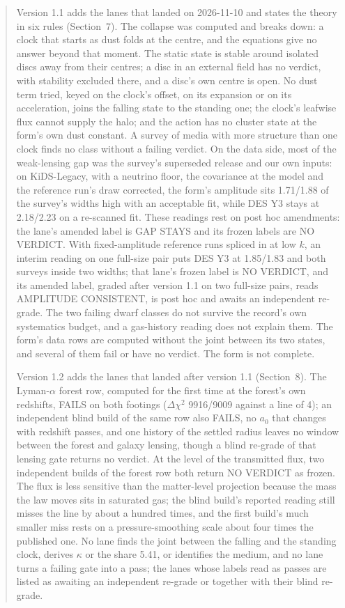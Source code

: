 \documentclass[10pt]{article}
\begin{document}
\begin{abstract}
Version 1.1 adds the lanes that landed on 2026-11-10 and states the theory in six rules (Section~7).
The collapse was computed and breaks down: a clock that starts as dust folds at the centre, and the equations give no answer beyond that moment.
The static state is stable around isolated discs away from their centres; a disc in an external field has no verdict, with stability excluded there, and a disc's own centre is open.
No dust term tried, keyed on the clock's offset, on its expansion or on its acceleration, joins the falling state to the standing one; the clock's leafwise flux cannot supply the halo; and the action has no cluster state at the form's own dust constant.
A survey of media with more structure than one clock finds no class without a failing verdict.
On the data side, most of the weak-lensing gap was the survey's superseded release and our own inputs: on KiDS-Legacy, with a neutrino floor, the covariance at the model and the reference run's draw corrected, the form's amplitude sits 1.71/1.88 of the survey's widths high with an acceptable fit, while DES Y3 stays at 2.18/2.23 on a re-scanned fit. These readings rest on post hoc amendments: the lane's amended label is GAP STAYS and its frozen labels are NO VERDICT. With fixed-amplitude reference runs spliced in at low $k$, an interim reading on one full-size pair puts DES Y3 at 1.85/1.83 and both surveys inside two widths; that lane's frozen label is NO VERDICT, and its amended label, graded after version 1.1 on two full-size pairs, reads AMPLITUDE CONSISTENT, is post hoc and awaits an independent re-grade.
The two failing dwarf classes do not survive the record's own systematics budget, and a gas-history reading does not explain them.
The form's data rows are computed without the joint between its two states, and several of them fail or have no verdict. The form is not complete.

Version 1.2 adds the lanes that landed after version 1.1 (Section~8). The Lyman-$\alpha$ forest row, computed for the first time at the forest's own redshifts, FAILS on both footings ($\Delta\chi^2$ 9916/9009 against a line of 4); an independent blind build of the same row also FAILS, no $a_0$ that changes with redshift passes, and one history of the settled radius leaves no window between the forest and galaxy lensing, though a blind re-grade of that lensing gate returns no verdict.
At the level of the transmitted flux, two independent builds of the forest row both return NO VERDICT as frozen. The flux is less sensitive than the matter-level projection because the mass the law moves sits in saturated gas; the blind build's reported reading still misses the line by about a hundred times, and the first build's much smaller miss rests on a pressure-smoothing scale about four times the published one.
No lane finds the joint between the falling and the standing clock, derives $\kappa$ or the share 5.41, or identifies the medium, and no lane turns a failing gate into a pass; the lanes whose labels read as passes are listed as awaiting an independent re-grade or together with their blind re-grade.


\end{abstract}
\end{document}
